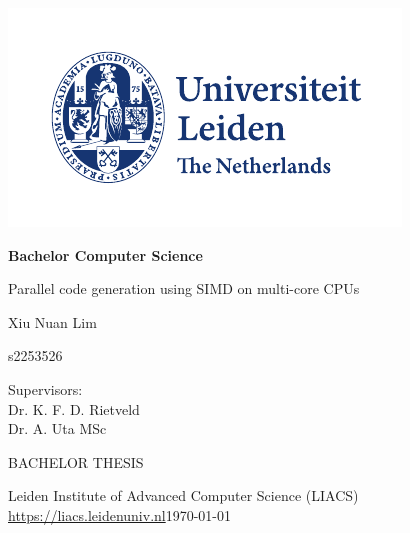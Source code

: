 \thispagestyle{empty}

\includegraphics{UL_Algemeen internationaal_CMYK}

\vspace{-2cm}\hfill \begin{LARGE}\textbf{Bachelor Computer Science}\end{LARGE}

\vspace{3.5cm}
\begin{Large}
\hfill Parallel code generation using SIMD on multi-core CPUs

\vspace{2.0cm}

\hfill Xiu Nuan Lim

\vspace{0.33cm}

\hfill s2253526
\end{Large}

\vspace{5.0cm}

\begin{large}

Supervisors:\\
Dr. K. F. D. Rietveld\\
Dr. A. Uta MSc


\vspace{2.0cm}
BACHELOR THESIS

\vspace{5mm}
Leiden Institute of Advanced Computer Science (LIACS)\\
\url{https://liacs.leidenuniv.nl}\hfill \today
\end{large}

\newpage

